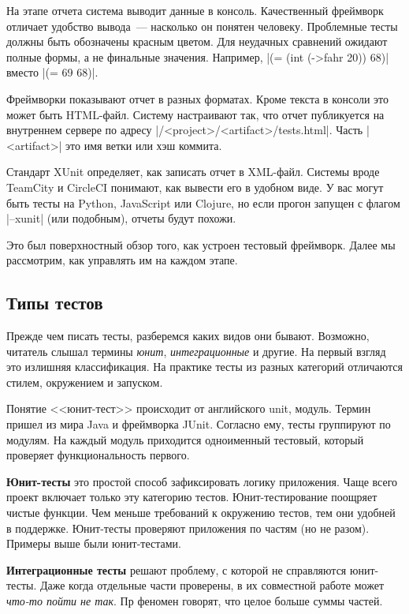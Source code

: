На этапе отчета система выводит данные в консоль. Качественный фреймворк
отличает удобство вывода~--- насколько он понятен человеку. Проблемные тесты
должны быть обозначены красным цветом. Для неудачных сравнений ожидают полные
формы, а не финальные значения. Например, \spverb|(= (int (->fahr 20)) 68)|
вместо \spverb|(= 69 68)|.

Фреймворки показывают отчет в разных форматах. Кроме текста в консоли это может
быть HTML-файл. Систему настраивают так, что отчет публикуется на внутреннем
сервере по адресу \spverb|/<project>/<artifact>/tests.html|. Часть
\spverb|<artifact>| это имя ветки или хэш коммита.

Стандарт XUnit определяет, как записать отчет в XML-файл. Системы вроде TeamCity
и CircleCI понимают, как вывести его в удобном виде. У вас могут быть тесты на
Python, JavaScript или Clojure, но если прогон запущен с флагом \spverb|--xunit|
(или подобным), отчеты будут похожи.

Это был поверхностный обзор того, как устроен тестовый фреймворк. Далее мы
рассмотрим, как управлять им на каждом этапе.

\subsection{Типы тестов}

Прежде чем писать тесты, разберемся каких видов они бывают. Возможно, читатель
слышал термины \emph{юнит}, \emph{интеграционные} и другие. На первый взгляд это
излишняя классификация. На практике тесты из разных категорий отличаются стилем,
окружением и запуском.

Понятие <<юнит-тест>> происходит от английского unit, модуль. Термин пришел из
мира Java и фреймворка JUnit. Согласно ему, тесты группируют по модулям. На
каждый модуль приходится одноименный тестовый, который проверяет
функциональность первого.

\textbf{Юнит-тесты} это простой способ зафиксировать логику приложения. Чаще
всего проект включает только эту категорию тестов. Юнит-тестирование поощряет
чистые функции. Чем меньше требований к окружению тестов, тем они удобней в
поддержке. Юнит-тесты проверяют приложения по частям (но не разом). Примеры выше
были юнит-тестами.

\textbf{Интеграционные тесты} решают проблему, с которой не справляются
юнит-тесты. Даже когда отдельные части проверены, в их совместной работе может
\emph{что-то пойти не так}. Пр феномен говорят, что целое больше суммы частей.

